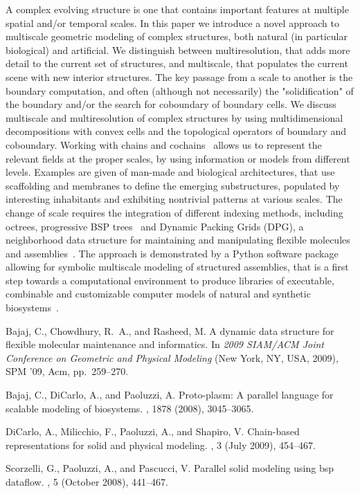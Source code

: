 A complex evolving structure is one that contains important features at multiple spatial and/or temporal scales. In this paper we introduce a novel approach to multiscale geometric modeling of complex structures, both natural (in particular biological) and artificial. We distinguish between multiresolution, that adds more detail to the current set of structures, and multiscale, that populates the current scene with new interior structures. The key passage from a scale to another is the boundary computation, and often (although not necessarily) the "solidification" of the boundary and/or the search for coboundary of boundary cells.  We discuss multiscale and multiresolution of complex structures by using multidimensional decompositions with convex cells and the topological operators of boundary and coboundary. Working with chains and cochains~\cite{DicarloMPS09} allows us to represent the relevant fields at the proper scales, by using information or models from different levels. Examples are given of man-made and biological architectures, that use scaffolding and membranes to define the emerging substructures, populated by interesting inhabitants and exhibiting nontrivial patterns at various scales. The change of scale requires the integration of different indexing methods, including octrees, progressive BSP trees~\cite{ScorzelliPP-PSM2008} and Dynamic Packing Grids (DPG), a neighborhood data structure for maintaining and manipulating flexible molecules and assemblies~\cite{Bajaj:2009:DDS:1629255.1629287}. The approach is demonstrated by a Python software package allowing for symbolic multiscale modeling of structured assemblies, that is a first step towards a computational environment to produce libraries of executable, combinable and customizable computer models of natural and synthetic biosystems~\cite{BajajDP-PPP2008}.



\begin{thebibliography}{10}

{\sc Bajaj, C., Chowdhury, R.~A., and Rasheed, M.}
\newblock A dynamic data structure for flexible molecular maintenance and
  informatics.
\newblock In {\em 2009 SIAM/ACM Joint Conference on Geometric and Physical
  Modeling\/} (New York, NY, {USA}, 2009), SPM '09, Acm, pp.~259--270.

{\sc Bajaj, C., DiCarlo, A., and Paoluzzi, A.}
\newblock Proto-plasm: A parallel language for scalable modeling of biosystems.
, 1878
  (2008), 3045--3065.

{\sc DiCarlo, A., Milicchio, F., Paoluzzi, A., and Shapiro, V.}
\newblock Chain-based representations for solid and physical modeling.
, 3
  (July 2009), 454--467.

{\sc Scorzelli, G., Paoluzzi, A., and Pascucci, V.}
\newblock Parallel solid modeling using bsp dataflow.
, 5 (October 2008), 441--467.

\end{thebibliography}

